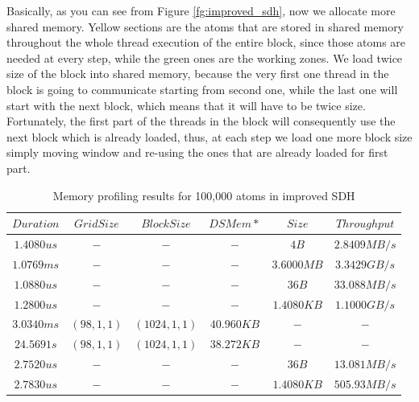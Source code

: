 \documentclass[12pt,letterpaper]{report}
\begin{document}
Basically, as you can see from Figure \ref{fg:improved_sdh}, now we allocate more shared memory. Yellow sections are the atoms that are stored in shared memory throughout the whole thread execution of the entire block, since those atoms are needed at every step, while the green ones are the working zones. We load twice size of the block into shared memory, because the very first one thread in the block is going to communicate starting from second one, while the last one will start with the next block, which means that it will have to be twice size. Fortunately, the first part of the threads in the block will consequently use the next block which is already loaded, thus, at each step we load one more block size simply moving window and re-using the ones that are already loaded for first part.


\begin{table}[h!]
	\renewcommand*{\arraystretch}{1.5}
	\tabcolsep=0.12cm
  \centering
  \begin{tabular}{| c | c | c | c | c | c |}
   \hline

$Duration $ & $ Grid Size $ & $ Block Size $ & $ DSMem* $ & $ Size $ & $ Throughput $ \\ \hline 
$1.4080us $ & $ - $ & $ - $ & $ - $ & $ 4B $ & $ 2.8409MB/s $ \\ \hline 
$1.0769ms $ & $ - $ & $ - $ & $ - $ & $ 3.6000MB $ & $ 3.3429GB/s $ \\ \hline 
$1.0880us $ & $ - $ & $ - $ & $ - $ & $ 36B $ & $ 33.088MB/s $ \\ \hline 
$1.2800us $ & $ - $ & $ - $ & $ - $ & $ 1.4080KB $ & $ 1.1000GB/s $ \\ \hline 
$3.0340ms $ & $ (98, 1, 1) $ & $ (1024, 1, 1) $ & $ 40.960KB $ & $ - $  & $-$ \\ \hline 
$24.5691s $ & $ (98, 1, 1) $ & $  (1024, 1, 1) $ & $ 38.272KB $ & $ - $ & $ - $ \\ \hline 
$2.7520us $ & $ - $ & $ - $ & $ - $ & $ 36B $ & $ 13.081MB/s $ \\ \hline 
$2.7830us $ & $ - $ & $ - $ & $ - $ & $ 1.4080KB $ & $ 505.93MB/s $    
 \\ \hline 

	\hline
  \end{tabular}
    \caption{Memory profiling results for 100,000 atoms in improved SDH}
    	  \label{tb:gpumem100000_improved}
\end{table}
\end{document}

